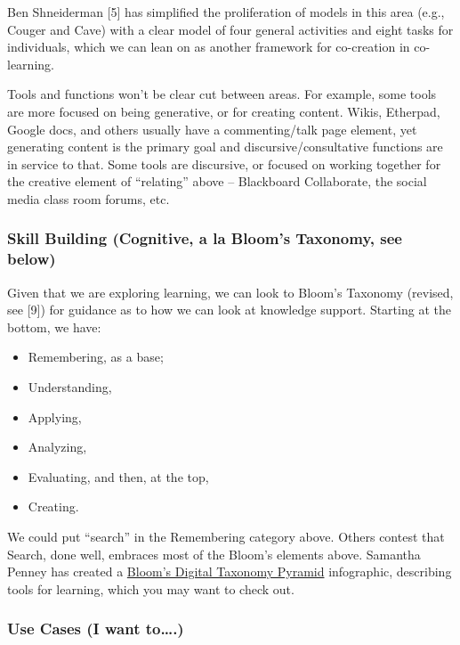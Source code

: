 Ben Shneiderman {{[}5{]}} has simplified the proliferation of models in
this area (e.g., Couger and Cave) with a clear model of four general
activities and eight tasks for individuals, which we can lean on as
another framework for co-creation in co-learning.

Tools and functions won't be clear cut between areas. For example, some
tools are more focused on being generative, or for creating content.
Wikis, Etherpad, Google docs, and others usually have a commenting/talk
page element, yet generating content is the primary goal and
discursive/consultative functions are in service to that. Some tools are
discursive, or focused on working together for the creative element of
``relating'' above -- Blackboard Collaborate, the social media class
room forums, etc.

\hypertarget{skill-building-cognitive-a-la-blooms-taxonomy-see-below}{%
\subsubsection{Skill Building (Cognitive, a la Bloom's Taxonomy, see
below)}\label{skill-building-cognitive-a-la-blooms-taxonomy-see-below}}

Given that we are exploring learning, we can look to Bloom's Taxonomy
(revised, see {{[}9{]}}) for guidance as to how we can look at knowledge
support. Starting at the bottom, we have:

\begin{itemize}
\tightlist
\item
  Remembering, as a base;
\item
  Understanding,
\item
  Applying,
\item
  Analyzing,
\item
  Evaluating, and then, at the top,
\item
  Creating.
\end{itemize}

We could put ``search'' in the Remembering category above. Others
contest that Search, done well, embraces most of the Bloom's elements
above. Samantha Penney has created a
\href{http://www.usi.edu/distance/bdt.htm}{Bloom's Digital Taxonomy
Pyramid} infographic, describing tools for learning, which you may want
to check out.

\hypertarget{use-cases-i-want-to.}{%
\subsubsection{Use Cases (I want
to\ldots.)}\label{use-cases-i-want-to.}}

